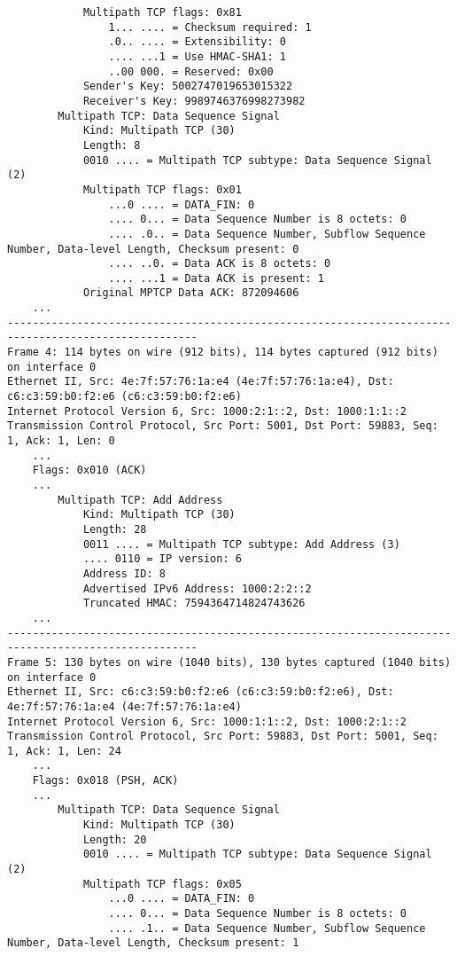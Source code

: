 \begin{verbatim}
            Multipath TCP flags: 0x81
                1... .... = Checksum required: 1
                .0.. .... = Extensibility: 0
                .... ...1 = Use HMAC-SHA1: 1
                ..00 000. = Reserved: 0x00
            Sender's Key: 5002747019653015322
            Receiver's Key: 9989746376998273982
        Multipath TCP: Data Sequence Signal
            Kind: Multipath TCP (30)
            Length: 8
            0010 .... = Multipath TCP subtype: Data Sequence Signal (2)
            Multipath TCP flags: 0x01
                ...0 .... = DATA_FIN: 0
                .... 0... = Data Sequence Number is 8 octets: 0
                .... .0.. = Data Sequence Number, Subflow Sequence Number, Data-level Length, Checksum present: 0
                .... ..0. = Data ACK is 8 octets: 0
                .... ...1 = Data ACK is present: 1
            Original MPTCP Data ACK: 872094606
    ...
----------------------------------------------------------------------------------------------------
Frame 4: 114 bytes on wire (912 bits), 114 bytes captured (912 bits) on interface 0
Ethernet II, Src: 4e:7f:57:76:1a:e4 (4e:7f:57:76:1a:e4), Dst: c6:c3:59:b0:f2:e6 (c6:c3:59:b0:f2:e6)
Internet Protocol Version 6, Src: 1000:2:1::2, Dst: 1000:1:1::2
Transmission Control Protocol, Src Port: 5001, Dst Port: 59883, Seq: 1, Ack: 1, Len: 0
    ...
    Flags: 0x010 (ACK)
    ...
        Multipath TCP: Add Address
            Kind: Multipath TCP (30)
            Length: 28
            0011 .... = Multipath TCP subtype: Add Address (3)
            .... 0110 = IP version: 6
            Address ID: 8
            Advertised IPv6 Address: 1000:2:2::2
            Truncated HMAC: 7594364714824743626
    ...
----------------------------------------------------------------------------------------------------
Frame 5: 130 bytes on wire (1040 bits), 130 bytes captured (1040 bits) on interface 0
Ethernet II, Src: c6:c3:59:b0:f2:e6 (c6:c3:59:b0:f2:e6), Dst: 4e:7f:57:76:1a:e4 (4e:7f:57:76:1a:e4)
Internet Protocol Version 6, Src: 1000:1:1::2, Dst: 1000:2:1::2
Transmission Control Protocol, Src Port: 59883, Dst Port: 5001, Seq: 1, Ack: 1, Len: 24
    ...
    Flags: 0x018 (PSH, ACK)
    ...
        Multipath TCP: Data Sequence Signal
            Kind: Multipath TCP (30)
            Length: 20
            0010 .... = Multipath TCP subtype: Data Sequence Signal (2)
            Multipath TCP flags: 0x05
                ...0 .... = DATA_FIN: 0
                .... 0... = Data Sequence Number is 8 octets: 0
                .... .1.. = Data Sequence Number, Subflow Sequence Number, Data-level Length, Checksum present: 1

\end{verbatim}
